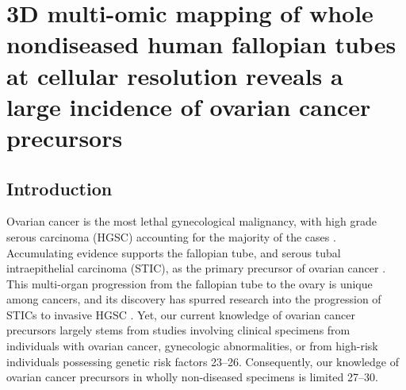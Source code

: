 \chapter{3D multi-omic mapping of whole nondiseased human fallopian tubes at cellular resolution reveals a large incidence of ovarian cancer precursors} \label{chap:chap-3}
\begin{refsection}
    
    \section{Introduction}
    Ovarian cancer is the most lethal gynecological malignancy, with high grade serous carcinoma (HGSC) accounting for the majority of the cases \cite{Bowtell2015Rethinking,Kurman2016Dualistic,Patch2015Wholegenome,Lisio2019High, Kim2018Cell, Shih2021Origin}. Accumulating evidence supports the fallopian tube, and serous tubal intraepithelial carcinoma (STIC), as the primary precursor of ovarian cancer \cite{Shih2021Origin,Kindelberger2007Intraepithelial,Folkins2008candidate, Kurman2010Origin,Carlson2010Serous,Erickson2013role, Piek2001Dysplastic, Labidi2017High, Wu2019Genomic, Kuhn2012TP53}. This multi-organ progression from the fallopian tube to the ovary is unique among cancers, and its discovery has spurred research into the progression of STICs to invasive HGSC \cite{Labidi2017High,Zhang2019Both,McDaniel2015Next,Anand2021Single, Wang2022Spatial, Wang2024Aneuploidy,Pisanic2020Methylomic}. Yet, our current knowledge of ovarian cancer precursors largely stems from studies involving clinical specimens from individuals with ovarian cancer, gynecologic abnormalities, or from high-risk individuals possessing genetic risk factors\cite{Kurman2008Pathogenesis,Liberto2022Current,Jones2017Genetic,Kauff2002Risk} 23–26. Consequently, our knowledge of ovarian cancer precursors in wholly non-diseased specimens is limited \cite{Eckert2016Genomics,Kuchenbaecker2017Risks,Collins2011tubal,Chambers2022Is} 27–30.

\end{refsection}
